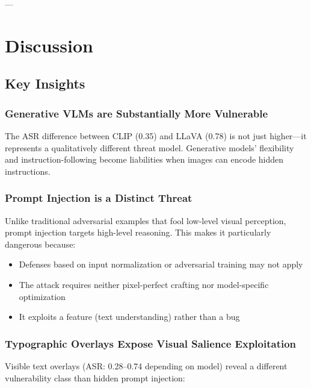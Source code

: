 \documentclass[11pt]{article}
\begin{document}
---

\section{Discussion}

\subsection{Key Insights}

\subsubsection{Generative VLMs are Substantially More Vulnerable}

The ASR difference between CLIP (0.35) and LLaVA (0.78) is not just higher---it represents a qualitatively different threat model. Generative models' flexibility and instruction-following become liabilities when images can encode hidden instructions.

\subsubsection{Prompt Injection is a Distinct Threat}

Unlike traditional adversarial examples that fool low-level visual perception, prompt injection targets high-level reasoning. This makes it particularly dangerous because:
\begin{itemize}[leftmargin=2em]
    \item Defenses based on input normalization or adversarial training may not apply
    \item The attack requires neither pixel-perfect crafting nor model-specific optimization
    \item It exploits a feature (text understanding) rather than a bug
\end{itemize}

\subsubsection{Typographic Overlays Expose Visual Salience Exploitation}

Visible text overlays (ASR: 0.28--0.74 depending on model) reveal a different vulnerability class than hidden prompt injection:
\end{document}
